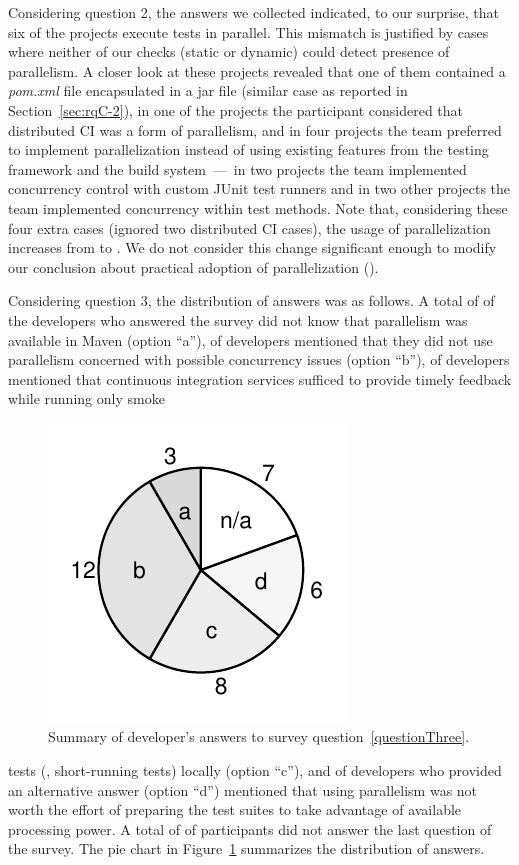 Considering question 2, the answers we collected indicated, to our
surprise, that six of the \emailsProjectsAnswered{} projects execute
tests in parallel.  This mismatch is justified by cases where neither
of our checks (static or dynamic) could detect presence of
parallelism.  A closer look at these projects revealed that one of
them contained a \emph{pom.xml} file encapsulated in a jar file
(similar case as reported in Section~\ref{sec:rqC-2}), in one of the
projects the participant considered that distributed CI was a form of
parallelism, and in four projects the team preferred to implement
parallelization instead of using existing features from the testing
framework and the build system~---~in two projects the team
implemented concurrency control with custom JUnit test runners and in
two other projects the team implemented concurrency within test
methods.  Note that, considering these four extra cases (ignored two
distributed CI cases), the usage of parallelization increases from
\percentParallel{} to \percentParallelUpdated{}.  We do not consider
this change significant enough to modify our conclusion about
practical adoption of parallelization (\numRQAdoptionOne{}).



Considering question 3, the distribution of answers was as follows.  A
total of \emailsA{} of the \emailsProjectsAnswered{} developers who
answered the survey did not know that parallelism was available in
Maven (option ``a''), \emailsB{} of developers mentioned that they did
not use parallelism concerned with possible concurrency issues (option
``b''), \emailsD{} of developers mentioned that continuous integration
services sufficed to provide timely feedback while running only smoke
\begin{figure}%
    \centering
    \includegraphics[width=.18\textwidth]{results/survey.pdf}
    \caption{\label{fig:rq5-answers}Summary of developer's answers to
      survey question~\ref{questionThree}.}
\end{figure}
tests (\ie{}, short-running tests) locally (option ``c''), and \emailsD{} of
developers who provided an alternative answer (option ``d'') mentioned
that using parallelism was not worth the effort of preparing the test
suites to take advantage of available processing power.  A total of
\emailsNA{} of participants did not answer the last question of the
survey.  The pie chart in Figure~\ref{fig:rq5-answers} 
summarizes the distribution of answers.

